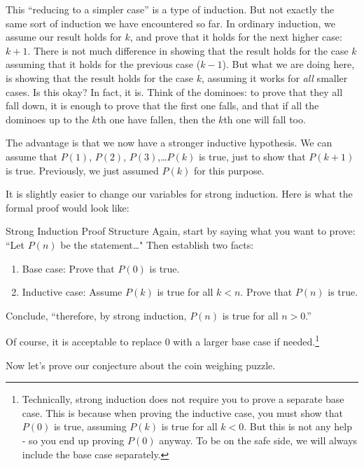 \documentclass[12pt]{article}
\begin{document}
This ``reducing to a simpler case'' is a type of induction.  But not exactly the same sort of induction we have encountered so far.  In ordinary induction, we assume our result holds for $k$, and prove that it holds for the next higher case: $k+1$.  There is not much difference in showing that the result holds for the case $k$ assuming that it holds for the previous case ($k-1$).  But what we are doing here, is showing that the result holds for the case $k$, assuming it works for {\em all} smaller cases.  Is this okay?  In fact, it is.  Think of the dominoes: to prove that they all fall down, it is enough to prove that the first one falls, and that if all the dominoes up to the $k$th one have fallen, then the $k$th one will fall too.

The advantage is that we now have a stronger inductive hypothesis.  We can assume that $P(1)$, $P(2)$, $P(3)$,\ldots $P(k)$ is true, just to show that $P(k+1)$ is true.  Previously, we just assumed $P(k)$ for this purpose.

It is slightly easier to change our variables for strong induction.  Here is what the formal proof would look like:

\newpage
\begin{defbox}{Strong Induction Proof Structure}
	Again, start by saying what you want to prove: ``Let $P(n)$ be the statement\ldots"  Then establish two facts:
	\begin{enumerate}
	\item Base case: Prove that $P(0)$ is true.
	\item Inductive case: Assume $P(k)$ is true for all $k < n$.  Prove that $P(n)$ is true.
	\end{enumerate}
	Conclude, ``therefore, by strong induction, $P(n)$ is true for all $n > 0$.''
\end{defbox}

Of course, it is acceptable to replace 0 with a larger base case if needed.\footnote{Technically, strong induction does not require you to prove a separate base case.  This is because when proving the inductive case, you must show that $P(0)$ is true, assuming $P(k)$ is true for all $k < 0$.  But this is not any help - so you end up proving $P(0)$ anyway.  To be on the safe side, we will always include the base case separately.}

Now let's prove our conjecture about the coin weighing puzzle.
\end{document}
